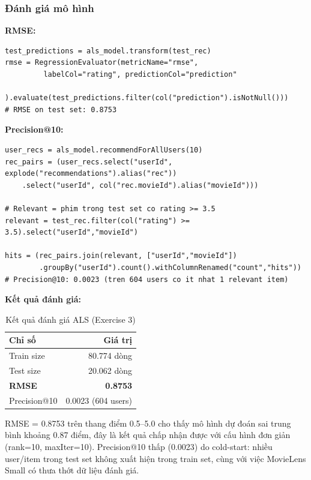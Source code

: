 \subsubsection{Đánh giá mô hình}

\textbf{RMSE:}

\begin{lstlisting}[style=PythonStyle, caption={Tính RMSE trên tập kiểm tra}]
test_predictions = als_model.transform(test_rec)
rmse = RegressionEvaluator(metricName="rmse",
         labelCol="rating", predictionCol="prediction"
       ).evaluate(test_predictions.filter(col("prediction").isNotNull()))
# RMSE on test set: 0.8753
\end{lstlisting}

\textbf{Precision@10:}

\begin{lstlisting}[style=PythonStyle, caption={Tính Precision@10}]
user_recs = als_model.recommendForAllUsers(10)
rec_pairs = (user_recs.select("userId", explode("recommendations").alias("rec"))
    .select("userId", col("rec.movieId").alias("movieId")))

# Relevant = phim trong test set co rating >= 3.5
relevant = test_rec.filter(col("rating") >= 3.5).select("userId","movieId")

hits = (rec_pairs.join(relevant, ["userId","movieId"])
        .groupBy("userId").count().withColumnRenamed("count","hits"))
# Precision@10: 0.0023 (tren 604 users co it nhat 1 relevant item)
\end{lstlisting}

\textbf{Kết quả đánh giá:}

\begin{table}[h]
\centering
\begin{tabular}{|l|r|}
\hline
\textbf{Chỉ số} & \textbf{Giá trị} \\
\hline
Train size       & 80.774 dòng \\
\hline
Test size        & 20.062 dòng \\
\hline
\textbf{RMSE}    & \textbf{0.8753} \\
\hline
Precision@10     & 0.0023 (604 users) \\
\hline
\end{tabular}
\caption{Kết quả đánh giá ALS (Exercise 3)}
\end{table}

RMSE = 0.8753 trên thang điểm 0.5--5.0 cho thấy mô hình dự đoán sai trung bình khoảng 0.87 điểm, đây là kết quả chấp nhận được với cấu hình đơn giản (rank=10, maxIter=10). Precision@10 thấp (0.0023) do cold-start: nhiều user/item trong test set không xuất hiện trong train set, cùng với việc MovieLens Small có thưa thớt dữ liệu đánh giá.

